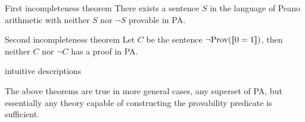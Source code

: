 \documentclass[12pt]{article}
\DeclarePairedDelimiter{\enc}{[\![}{]\!]}
\newcommand{\prov}{\text{Prov}}
\begin{document}
	\begin{theorem}{First incompleteness theorem}
		There exists a sentence $S$ in the language of Peano arithmetic with neither $S$ nor $\lnot S$ provable in PA.
	\end{theorem}

	\begin{theorem}{Second incompleteness theorem}
		Let $C$ be the sentence $\lnot\prov(\enc{0=1})$, then neither $C$ nor $\lnot C$ has a proof in PA.		
	\end{theorem}

	\begin{tcolorbox}[colback=red!5!white,colframe=red!75!black,title=TODO]
		intuitive descriptions
	\end{tcolorbox}

	The above theorems are true in more general cases, any superset of PA, but essentially any theory capable of constructing the provability predicate is sufficient.
	
\end{document}
